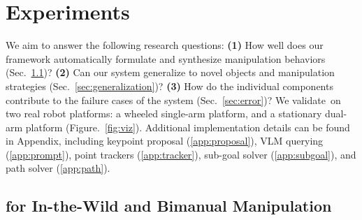 \section{Experiments}\label{sec:exp}
We aim to answer the following research questions:
\textbf{(1)} How well does our framework automatically formulate and synthesize manipulation behaviors (Sec.~\ref{sec:result})? 
\textbf{(2)} Can our system generalize to novel objects and manipulation strategies (Sec.~\ref{sec:generalization})?
\textbf{(3)} How do the individual components contribute to the failure cases of the system (Sec.~\ref{sec:error})?
We validate~\algabrvname on two real robot platforms: a wheeled single-arm platform, and a stationary dual-arm platform (Figure.~\ref{fig:viz}).
Additional implementation details can be found in Appendix, including keypoint proposal (\ref{app:proposal}), VLM querying (\ref{app:prompt}), point trackers (\ref{app:tracker}), sub-goal solver (\ref{app:subgoal}), and path solver (\ref{app:path}).





\subsection{\algabrvname for In-the-Wild and Bimanual Manipulation}\label{sec:result}

